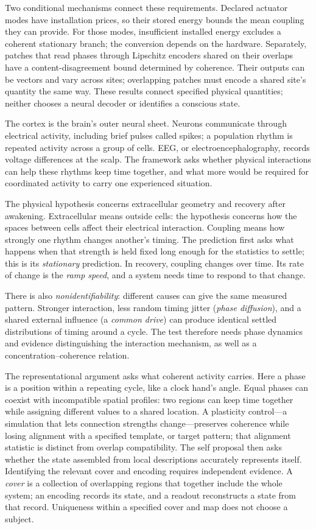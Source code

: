 \documentclass[11pt]{article}
\begin{document}
Two conditional mechanisms connect these requirements. Declared actuator modes
have installation prices, so their stored energy bounds the mean coupling they
can provide. For those modes, insufficient installed energy excludes a coherent
stationary branch; the conversion depends on the hardware. Separately, patches
that read phases through Lipschitz encoders shared on their overlaps have a
content-disagreement bound determined by coherence. Their outputs can be
vectors and vary across sites; overlapping patches must encode a shared site's
quantity the same way. These results connect specified physical quantities; neither chooses
a neural decoder or identifies a conscious state.

The cortex is the brain's outer neural sheet. Neurons communicate through
electrical activity, including brief pulses called spikes; a population rhythm
is repeated activity across a group of cells. EEG, or electroencephalography,
records voltage differences at the scalp. The framework asks whether physical
interactions can help these rhythms keep time together, and what more would
be required for coordinated activity to carry one experienced situation.

The physical hypothesis concerns extracellular geometry and recovery after
awakening. Extracellular means outside cells: the hypothesis concerns how
the spaces between cells affect their electrical interaction. Coupling means
how strongly one rhythm changes another's timing. The prediction first asks
what happens when that strength is held fixed long enough for the statistics
to settle; this is its \emph{stationary} prediction. In recovery, coupling
changes over time. Its rate of change is the \emph{ramp speed}, and a system
needs time to respond to that change.

There is also \emph{nonidentifiability}: different causes can give the same
measured pattern. Stronger interaction, less random timing jitter (\emph{phase
diffusion}), and a shared external influence (a \emph{common drive}) can produce
identical settled distributions of timing around a cycle. The test
therefore needs phase dynamics and evidence distinguishing the interaction
mechanism, as well as a concentration--coherence relation.

The representational argument asks what coherent activity carries.
Here a phase is a position within a repeating cycle, like a clock hand's angle.
Equal phases can coexist with incompatible spatial profiles: two regions can
keep time together while assigning different values to a shared location. A plasticity
control---a simulation that lets connection strengths change---preserves
coherence while losing alignment with a specified template, or target pattern;
that alignment statistic is distinct from overlap compatibility. The self
proposal then asks whether the state assembled from local descriptions
accurately represents itself. Identifying the relevant cover and encoding
requires independent evidence. A \emph{cover} is a collection of overlapping
regions that together include the whole system; an encoding records its state,
and a readout reconstructs a state from that record. Uniqueness within a specified cover and map
does not choose a subject.
\end{document}

